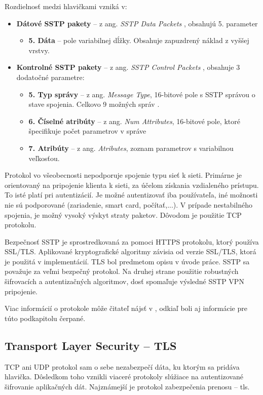 Rozdielnosť medzi hlavičkami vzniká v:
\begin{itemize}
	\item{\textbf{Dátové SSTP pakety}} -- z ang. \textit{SSTP Data Packets} \cite{datpak}, obsahujú 5. parameter 
		\begin{itemize}
			\item{\textbf{5. Dáta}} -- pole variabilnej dĺžky. Obsahuje zapuzdrený náklad z vyššej vrstvy.
		\end{itemize} 
	\item{\textbf{Kontrolné SSTP pakety}} -- z ang. \textit{SSTP Control Packets} \cite{conpak}, obsahuje 3 dodatočné parametre:
		\begin{itemize}
			\item{\textbf{5. Typ správy}} -- z ang. \textit{Message Type}, 16-bitové pole s SSTP správou o stave spojenia. Celkovo 9 možných správ \cite{conpak}. 
			\item{\textbf{6. Číselné atribúty}} -- z ang. \textit{Num Attributes}, 16-bitové pole, ktoré špecifikuje počet parametrov v správe
			\item{\textbf{7. Atribúty}} -- z ang. \textit{Atributes}, zoznam parametrov s variabilnou veľkosťou.
		\end{itemize}	
\end{itemize}   
 
Protokol vo všeobecnosti nepodporuje spojenie typu sieť k sieti. Primárne je orientovaný na pripojenie klienta k sieti, za účelom získania vzdialeného prístupu. To isté platí pri autentizácií. Je možné autentizovať iba používateľa, iné možnosti nie sú podporované (zariadenie, smart card, počítať,...). V prípade nestabilného spojenia, je možný vysoký výskyt straty paketov. Dôvodom je použitie TCP protokolu. 

Bezpečnosť SSTP je sprostredkovaná za pomoci HTTPS protokolu, ktorý používa SSL/TLS. Aplikované kryptografické algoritmy závisia od verzie SSL/TLS, ktorá je použitá v implementácií. TLS bol predmetom opisu v úvode práce. SSTP sa považuje za veľmi bezpečný protokol. Na druhej strane použitie robustných šifrovacích a autentizačných algoritmov, dosť spomaľuje výsledné SSTP VPN pripojenie.

Viac informácií o protokole môže čitateľ nájsť v \cite{mssstp}, odkiaľ boli aj informácie pre túto podkapitolu čerpané.  

\subsection{Transport Layer Security -- TLS}
TCP ani UDP protokol sam o sebe nezabezpečí dáta, ku ktorým sa pridáva hlavička. Dôsledkom toho vznikli viaceré protokoly slúžiace na autentizované šifrovanie aplikačných dát. Najznámejší je protokol zabezpečenia prenosu -- \acrshort{tls}. 

